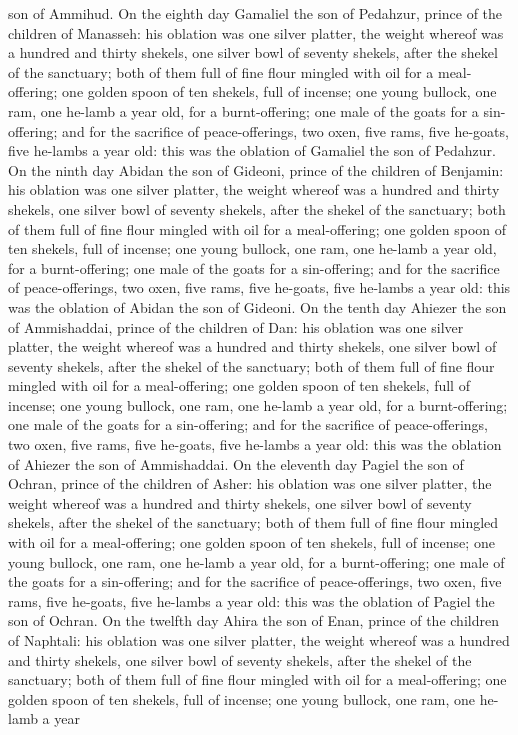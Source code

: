 son of Ammihud.  On the eighth day Gamaliel the son of Pedahzur, prince of the children of Manasseh: his oblation was one silver platter, the weight whereof was a hundred and thirty shekels, one silver bowl of seventy shekels, after the shekel of the sanctuary; both of them full of fine flour mingled with oil for a meal-offering; one golden spoon of ten shekels, full of incense; one young bullock, one ram, one he-lamb a year old, for a burnt-offering; one male of the goats for a sin-offering; and for the sacrifice of peace-offerings, two oxen, five rams, five he-goats, five he-lambs a year old: this was the oblation of Gamaliel the son of Pedahzur.  On the ninth day Abidan the son of Gideoni, prince of the children of Benjamin: his oblation was one silver platter, the weight whereof was a hundred and thirty shekels, one silver bowl of seventy shekels, after the shekel of the sanctuary; both of them full of fine flour mingled with oil for a meal-offering; one golden spoon of ten shekels, full of incense; one young bullock, one ram, one he-lamb a year old, for a burnt-offering; one male of the goats for a sin-offering; and for the sacrifice of peace-offerings, two oxen, five rams, five he-goats, five he-lambs a year old: this was the oblation of Abidan the son of Gideoni.  On the tenth day Ahiezer the son of Ammishaddai, prince of the children of Dan: his oblation was one silver platter, the weight whereof was a hundred and thirty shekels, one silver bowl of seventy shekels, after the shekel of the sanctuary; both of them full of fine flour mingled with oil for a meal-offering; one golden spoon of ten shekels, full of incense; one young bullock, one ram, one he-lamb a year old, for a burnt-offering; one male of the goats for a sin-offering; and for the sacrifice of peace-offerings, two oxen, five rams, five he-goats, five he-lambs a year old: this was the oblation of Ahiezer the son of Ammishaddai.  On the eleventh day Pagiel the son of Ochran, prince of the children of Asher: his oblation was one silver platter, the weight whereof was a hundred and thirty shekels, one silver bowl of seventy shekels, after the shekel of the sanctuary; both of them full of fine flour mingled with oil for a meal-offering; one golden spoon of ten shekels, full of incense; one young bullock, one ram, one he-lamb a year old, for a burnt-offering; one male of the goats for a sin-offering; and for the sacrifice of peace-offerings, two oxen, five rams, five he-goats, five he-lambs a year old: this was the oblation of Pagiel the son of Ochran.  On the twelfth day Ahira the son of Enan, prince of the children of Naphtali: his oblation was one silver platter, the weight whereof was a hundred and thirty shekels, one silver bowl of seventy shekels, after the shekel of the sanctuary; both of them full of fine flour mingled with oil for a meal-offering; one golden spoon of ten shekels, full of incense; one young bullock, one ram, one he-lamb a year 